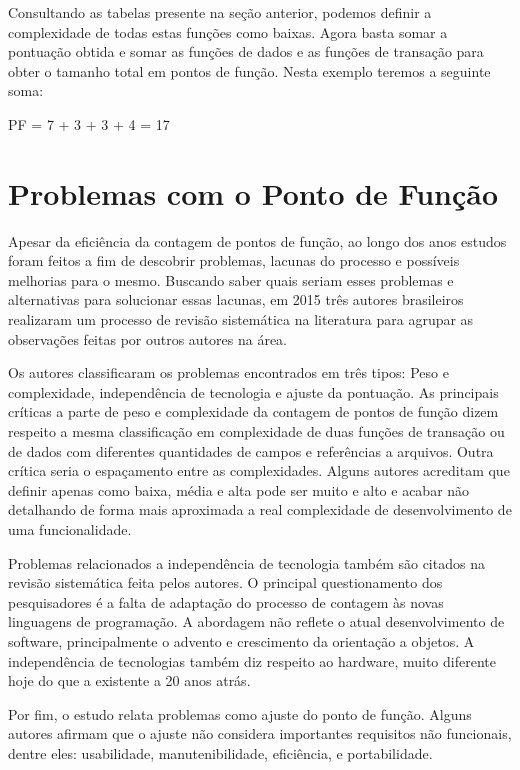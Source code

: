 Consultando as tabelas presente na seção anterior, podemos definir a complexidade de todas estas funções como baixas. Agora basta somar a pontuação obtida e somar as funções de dados e as funções de transação para obter o tamanho total em pontos de função. Nesta exemplo teremos a seguinte soma:

\centerline{PF = 7 + 3 + 3 + 4 = 17}

\section{Problemas com o Ponto de Função}

Apesar da eficiência da contagem de pontos de função, ao longo dos anos estudos foram feitos a fim de descobrir problemas, lacunas do processo e possíveis melhorias para o mesmo. Buscando saber quais seriam esses problemas e alternativas para solucionar essas lacunas, em 2015 três autores brasileiros realizaram um processo de revisão sistemática na literatura para agrupar as observações feitas por outros autores na área.

Os autores classificaram os problemas encontrados em três tipos: Peso e complexidade, independência de tecnologia e ajuste da pontuação. As principais críticas a parte de peso e complexidade da contagem de pontos de função dizem respeito a mesma classificação em complexidade de duas funções de transação ou de dados com diferentes quantidades de campos e referências a arquivos. Outra crítica seria o espaçamento entre as complexidades. Alguns autores acreditam que definir apenas como baixa, média e alta pode ser muito e alto e acabar não detalhando de forma mais aproximada a real complexidade de desenvolvimento de uma funcionalidade. \cite{Marcos:2015}

Problemas relacionados a independência de tecnologia também são citados na revisão sistemática feita pelos autores. O principal questionamento dos pesquisadores é a falta de adaptação do processo de contagem às novas linguagens de programação. A abordagem não reflete o atual desenvolvimento de software, principalmente o advento e crescimento da orientação a objetos. A independência de tecnologias também diz respeito ao hardware, muito diferente hoje do que a existente a 20 anos atrás. \cite{Marcos:2015}

Por fim, o estudo relata problemas como ajuste do ponto de função. Alguns autores afirmam que o ajuste não considera  importantes requisitos não funcionais, dentre eles: usabilidade, manutenibilidade, eficiência, e portabilidade. \cite{Marcos:2015}

